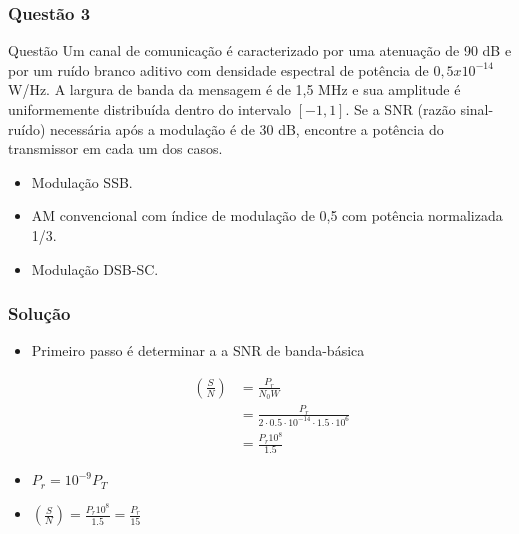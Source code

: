 \documentclass{beamer}
\begin{document}
\begin{frame}
  \frametitle{Questão 3}

  \begin{block}{Questão}
    Um canal de comunicação é caracterizado por uma atenuação de 90 dB e 
    por um ruído branco aditivo com densidade espectral de potência de 
    $0,5 x 10^{-14}$ W/Hz. A largura de banda da mensagem é de 1,5 MHz e 
    sua amplitude é uniformemente distribuída dentro do intervalo $[-1,1]$. 
    Se a SNR (razão sinal-ruído) necessária após a modulação é de 30 dB, 
    encontre a potência do transmissor em cada um dos casos.

    \begin{itemize}
      \item Modulação SSB.
      \item AM convencional com índice de modulação de 0,5 com potência normalizada 1/3.
      \item Modulação DSB-SC.
    \end{itemize}

  \end{block}

\end{frame}

\begin{frame}
  \frametitle{Solução}

  \begin{itemize}
    \item Primeiro passo é determinar a a SNR de banda-básica

    \begin{align*}
      \left(\frac{S}{N}\right) & = \frac{P_r}{N_0W} \\
      & = \frac{P_r}{2\cdot 0.5 \cdot 10^{-14} \cdot 1.5 \cdot 10^6} \\
      & = \frac{P_r10^8}{1.5}
    \end{align*}

    \item $P_r = 10^{-9}P_T$ 
    \item $\left(\frac{S}{N}\right) = \frac{P_r10^8}{1.5} = \frac{P_r}{15}$
  \end{itemize}

\end{frame}
\end{document}
